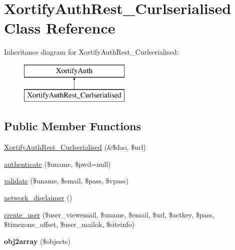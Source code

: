 \hypertarget{class_xortify_auth_rest___curlserialised}{\section{Xortify\-Auth\-Rest\-\_\-\-Curlserialised Class Reference}
\label{class_xortify_auth_rest___curlserialised}
}
Inheritance diagram for Xortify\-Auth\-Rest\-\_\-\-Curlserialised\-:\begin{figure}[H]
\begin{center}
\leavevmode
\includegraphics[height=2.000000cm]{class_xortify_auth_rest___curlserialised}
\end{center}
\end{figure}
\subsection*{Public Member Functions}
\begin{DoxyCompactItemize}
\item 
\hyperlink{class_xortify_auth_rest___curlserialised_acafd64bdbc9a35ddbf41d99fa965348a}{Xortify\-Auth\-Rest\-\_\-\-Curlserialised} (\&\$dao, \$url)
\item 
\hyperlink{class_xortify_auth_rest___curlserialised_a959a1fc872329a0f7145c9aafd34b871}{authenticate} (\$uname, \$pwd=null)
\item 
\hyperlink{class_xortify_auth_rest___curlserialised_a028fb950638c85e007145f41dee5837a}{validate} (\$uname, \$email, \$pass, \$vpass)
\item 
\hyperlink{class_xortify_auth_rest___curlserialised_a168511e628c10ee0992502f03df745ad}{network\-\_\-disclaimer} ()
\item 
\hyperlink{class_xortify_auth_rest___curlserialised_ab97602b000b7eda6fe7da9040a89c2af}{create\-\_\-user} (\$user\-\_\-viewemail, \$uname, \$email, \$url, \$actkey, \$pass, \$timezone\-\_\-offset, \$user\-\_\-mailok, \$siteinfo)
\item 
\hypertarget{class_xortify_auth_rest___curlserialised_af936c0dcc74e87b4a0b3019615c5b4ad}{{\bfseries obj2array} (\$objects)}\label{class_xortify_auth_rest___curlserialised_af936c0dcc74e87b4a0b3019615c5b4ad}

\end{DoxyCompactItemize}
